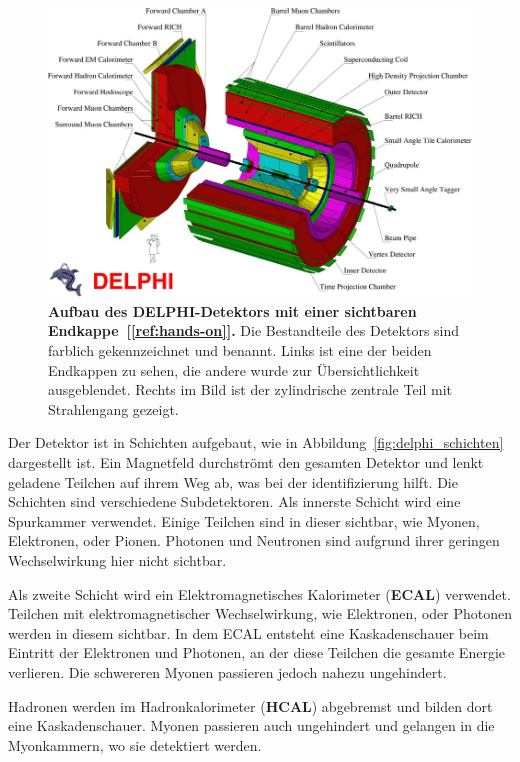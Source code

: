 \documentclass[a4paper,ngerman]{scrartcl}
\begin{document}
\begin{figure}[tbh!]
\centering
\includegraphics[width=\textwidth]{abbildungen/delphi_big.png}
\caption{\textbf{Aufbau des DELPHI-Detektors mit einer sichtbaren Endkappe~[\ref{ref:hands-on}].} 
Die Bestandteile des Detektors sind farblich gekennzeichnet und benannt.
Links ist eine der beiden Endkappen zu sehen, die andere wurde zur Übersichtlichkeit ausgeblendet.
Rechts im Bild ist der zylindrische zentrale Teil mit Strahlengang gezeigt. 
}
\label{fig:delphi_big}
\end{figure}

Der Detektor ist in Schichten aufgebaut, wie in Abbildung~\ref{fig:delphi_schichten} dargestellt ist.
Ein Magnetfeld durchströmt den gesamten Detektor und lenkt geladene Teilchen auf ihrem Weg ab, was bei der identifizierung hilft.
Die Schichten sind verschiedene Subdetektoren. 
Als innerste Schicht wird eine Spurkammer verwendet.
Einige Teilchen sind in dieser sichtbar, wie Myonen, Elektronen, oder Pionen.
Photonen und Neutronen sind aufgrund ihrer geringen Wechselwirkung hier nicht sichtbar.

Als zweite Schicht wird ein Elektromagnetisches Kalorimeter (\textbf{ECAL}) verwendet.
Teilchen mit elektromagnetischer Wechselwirkung, wie Elektronen, oder Photonen werden in diesem sichtbar.
In dem ECAL entsteht eine Kaskadenschauer beim Eintritt der Elektronen und Photonen, an der diese Teilchen die gesamte Energie verlieren. 
Die schwereren Myonen passieren jedoch nahezu ungehindert.

Hadronen werden im Hadronkalorimeter (\textbf{HCAL}) abgebremst und bilden dort eine Kaskadenschauer.
Myonen passieren auch ungehindert und gelangen in die Myonkammern, wo sie detektiert werden.
\end{document}
